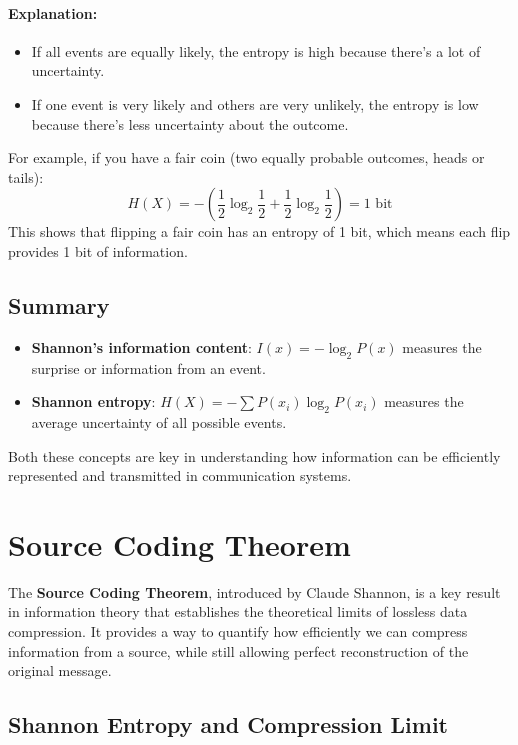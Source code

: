 \documentclass[12pt]{article}
\begin{document}
\paragraph{Explanation:}
\begin{itemize}
    \item If all events are equally likely, the entropy is high because there's a lot of uncertainty.
    \item If one event is very likely and others are very unlikely, the entropy is low because there's less uncertainty about the outcome.
\end{itemize}

For example, if you have a fair coin (two equally probable outcomes, heads or tails):
\[
H(X) = - \left( \frac{1}{2} \log_2 \frac{1}{2} + \frac{1}{2} \log_2 \frac{1}{2} \right) = 1 \text{ bit}
\]
This shows that flipping a fair coin has an entropy of 1 bit, which means each flip provides 1 bit of information.

\subsection{Summary}
\begin{itemize}
    \item \textbf{Shannon's information content}: \( I(x) = -\log_2 P(x) \) measures the surprise or information from an event.
    \item \textbf{Shannon entropy}: \( H(X) = -\sum P(x_i) \log_2 P(x_i) \) measures the average uncertainty of all possible events.
\end{itemize}

Both these concepts are key in understanding how information can be efficiently represented and transmitted in communication systems.

\section{Source Coding Theorem}

The \textbf{Source Coding Theorem}, introduced by Claude Shannon, is a key result in information theory that establishes the theoretical limits of lossless data compression. It provides a way to quantify how efficiently we can compress information from a source, while still allowing perfect reconstruction of the original message.

\subsection{Shannon Entropy and Compression Limit}
\end{document}
